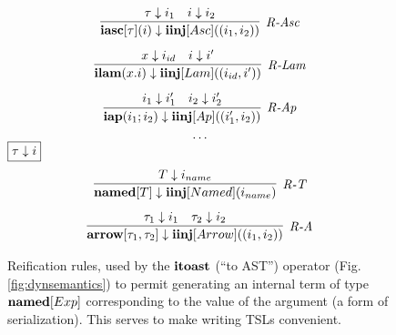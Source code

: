 \begin{figure}[t]
\begin{minipage}[t]{.44\textwidth}
\[\begin{array}{c}
\infer[\textit{R-Asc}]
	{\keyw{iasc}[\tau](i) \downarrow \keyw{iinj}[Asc]((i_1, i_2))}
	{\tau \downarrow i_1 & i \downarrow i_2}\\[2ex]
	
\infer[\textit{R-Lam}]
	{ \keyw{ilam}(x.i) \downarrow \keyw{iinj}[Lam]((i_{id}, i')) }
	{x \downarrow i_{id} & i \downarrow i'} \\[2ex]

\infer[\textit{R-Ap}]
	{ \keyw{iap}(i_1; i_2) \downarrow \keyw{iinj}[Ap]((i_1', i_2))}
	{ i_1 \downarrow i_1' & i_2 \downarrow i_2' }\\[1ex]
\cdots
\vspace{-10px}
\end{array}
\]
$\fbox{$\tau \downarrow i$}$
\vspace{-12px}
\[
\begin{array}{c}
\infer[\textit{R-T}]
	{ \keyw{named}[T] \downarrow \keyw{iinj}[Named](i_{name}) }
	{ T \downarrow i_{name}} \\[2ex]

\infer[\textit{R-A}]
	{ \keyw{arrow}[\tau_1,\tau_2] \downarrow \keyw{iinj}[Arrow]((i_1, i_2))  }
	{ \tau_1 \downarrow i_1 & \tau_2 \downarrow i_2 }
\end{array}
\vspace{-10px}
\]
\label{fig:reification}
\caption{Reification rules, used by the $\textbf{itoast}$ (``to AST'') operator (Fig. \ref{fig:dynsemantics}) to permit generating an internal term of type $\textbf{named}[Exp]$ corresponding to the value of the argument (a form of serialization). This serves to make writing TSLs convenient.}
\end{minipage}
\end{figure}

